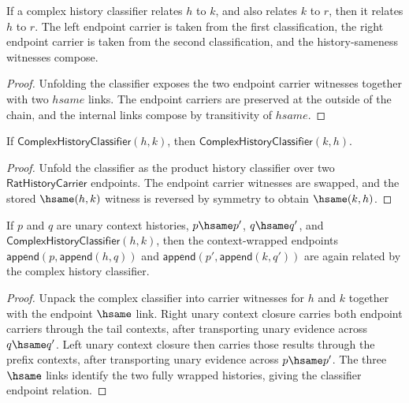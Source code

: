 \begin{theorem}
\label{thm:complex-history-classifier-transitivity}
If a complex history classifier relates \(h\) to \(k\), and also relates
\(k\) to \(r\), then it relates \(h\) to \(r\). The left endpoint carrier is
taken from the first classification, the right endpoint carrier is taken from
the second classification, and the history-sameness witnesses compose.
\end{theorem}
\begin{proof}
Unfolding the classifier exposes the two endpoint carrier witnesses together
with two \(hsame\) links. The endpoint carriers are preserved at the outside
of the chain, and the internal links compose by transitivity of \(hsame\).
\end{proof}

\begin{theorem}
\label{thm:complex-history-classifier-symmetry}
If $\mathsf{ComplexHistoryClassifier}(h,k)$, then $\mathsf{ComplexHistoryClassifier}(k,h)$.
\end{theorem}
\begin{proof}
Unfold the classifier as the product history classifier over two $\mathsf{RatHistoryCarrier}$ endpoints. The endpoint carrier witnesses are swapped, and the stored $\hsame(h,k)$ witness is reversed by symmetry to obtain $\hsame(k,h)$.
\end{proof}

\begin{theorem}
\label{thm:complex-history-classifier-unary-context-closed}
If \(p\) and \(q\) are unary context histories, \(p\hsame p'\),
\(q\hsame q'\), and \(\mathsf{ComplexHistoryClassifier}(h,k)\), then the
context-wrapped endpoints
\(\mathsf{append}(p,\mathsf{append}(h,q))\) and
\(\mathsf{append}(p',\mathsf{append}(k,q'))\) are again related by the complex
history classifier.
\end{theorem}
\begin{proof}
Unpack the complex classifier into carrier witnesses for \(h\) and \(k\)
together with the endpoint \(\hsame\) link. Right unary context closure carries
both endpoint carriers through the tail contexts, after transporting unary
evidence across \(q\hsame q'\). Left unary context closure then carries those
results through the prefix contexts, after transporting unary evidence across
\(p\hsame p'\). The three \(\hsame\) links identify the two fully wrapped
histories, giving the classifier endpoint relation.
\end{proof}

